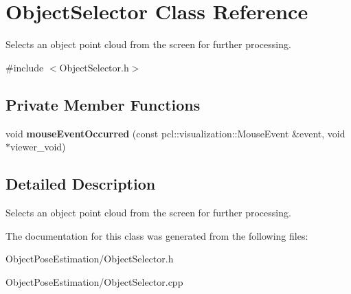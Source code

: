\hypertarget{class_object_selector}{\section{Object\-Selector Class Reference}
\label{class_object_selector}
}


Selects an object point cloud from the screen for further processing.  




{\ttfamily \#include $<$Object\-Selector.\-h$>$}

\subsection*{Private Member Functions}
\begin{DoxyCompactItemize}
\item 
\hypertarget{class_object_selector_a67d3c25f60400edb6f70859c36037a67}{void {\bfseries mouse\-Event\-Occurred} (const pcl\-::visualization\-::\-Mouse\-Event \&event, void $\ast$viewer\-\_\-void)}\label{class_object_selector_a67d3c25f60400edb6f70859c36037a67}

\end{DoxyCompactItemize}


\subsection{Detailed Description}
Selects an object point cloud from the screen for further processing. 

The documentation for this class was generated from the following files\-:\begin{DoxyCompactItemize}
\item 
Object\-Pose\-Estimation/Object\-Selector.\-h\item 
Object\-Pose\-Estimation/Object\-Selector.\-cpp\end{DoxyCompactItemize}
